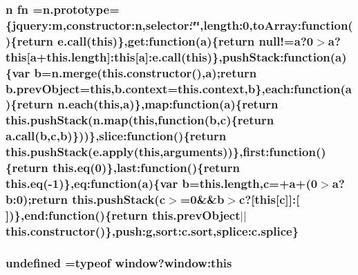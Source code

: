 \subsubsection[{\texorpdfstring{fn}{fn}}]{\setlength{\rightskip}{0pt plus 5cm}n fn ={\bf n.\+prototype}=\{jquery\+:m,constructor\+:n,selector\+:\char`\"{}\char`\"{},length\+:0,to\+Array\+:function()\{return e.\+call(this)\},get\+:function({\bf a})\{return null!={\bf a}?0$>${\bf a}?this\mbox{[}{\bf a}+{\bf this.\+length}\mbox{]}\+:this\mbox{[}{\bf a}\mbox{]}\+:e.\+call(this)\},push\+Stack\+:function({\bf a})\{var {\bf b}={\bf n.\+merge}({\bf this.\+constructor}(),{\bf a});return b.\+prev\+Object=this,b.\+context=this.\+context,{\bf b}\},each\+:function({\bf a})\{return {\bf n.\+each}(this,{\bf a})\},map\+:function({\bf a})\{return {\bf this.\+push\+Stack}({\bf n.\+map}(this,function({\bf b},{\bf c})\{return a.\+call({\bf b},{\bf c},{\bf b})\}))\},slice\+:function()\{return {\bf this.\+push\+Stack}(e.\+apply(this,arguments))\},first\+:function()\{return {\bf this.\+eq}(0)\},last\+:function()\{return {\bf this.\+eq}(-\/1)\},eq\+:function({\bf a})\{var {\bf b}={\bf this.\+length},{\bf c}=+{\bf a}+(0$>${\bf a}?b\+:0);return {\bf this.\+push\+Stack}({\bf c}$>$=0\&\&{\bf b}$>${\bf c}?\mbox{[}this\mbox{[}{\bf c}\mbox{]}\mbox{]}\+:\mbox{[}$\,$\mbox{]})\},end\+:function()\{return this.\+prev\+Object$\vert$$\vert${\bf this.\+constructor}()\},push\+:g,sort\+:c.\+sort,splice\+:c.\+splice\}}\hypertarget{jquery-2_82_81_8min_8js_a4f0af84f62a6e2f4aee1d072192b48ec}{}\label{jquery-2_82_81_8min_8js_a4f0af84f62a6e2f4aee1d072192b48ec}
\subsubsection[{\texorpdfstring{undefined}{undefined}}]{\setlength{\rightskip}{0pt plus 5cm}undefined =typeof {\bf window}?window\+:this}\hypertarget{jquery-2_82_81_8min_8js_ae21cc36bf0d65014c717a481a3f8a468}{}\label{jquery-2_82_81_8min_8js_ae21cc36bf0d65014c717a481a3f8a468}
